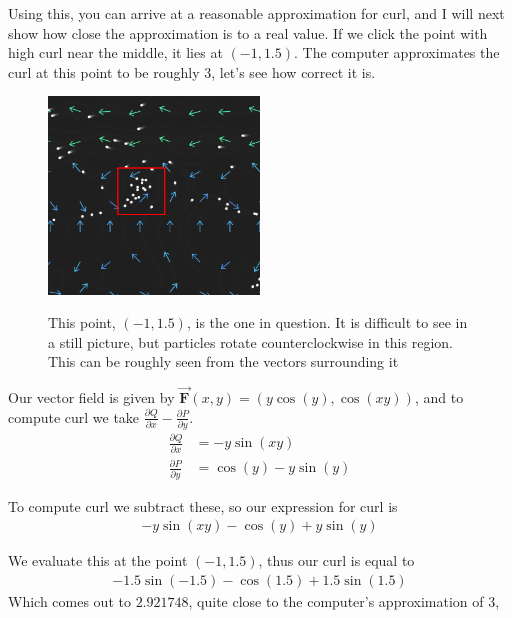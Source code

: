 \documentclass{article}
\begin{document}
    Using this, you can arrive at a reasonable approximation for curl, and I will next show how close the approximation is to a real value.
    If we click the point with high curl near the middle, it lies at $(-1, 1.5)$.
    The computer approximates the curl at this point to be roughly $3$, let's see how correct it is.
    \begin{figure}[h]
        \centering
        \includegraphics[width=0.5\textwidth]{2020-11-19_12-25}

        This point, $(-1, 1.5)$, is the one in question. It is difficult to see in a still picture, but particles rotate counterclockwise in this region.
        This can be roughly seen from the vectors surrounding it
    \end{figure}

    Our vector field is given by $\vec{ \mathbf{F} } (x, y) = (y \cos(y), \cos(xy))$, and to compute curl we take $\frac{\partial Q}{\partial x} - \frac{\partial P}{\partial y}$. 
    \begin{align*}
        \frac{\partial Q}{\partial x} &= -y\sin(xy) \\ 
        \frac{\partial P}{\partial y} &= \cos(y) - y\sin(y)
    \end{align*}

    To compute curl we subtract these, so our expression for curl is 
    \begin{gather*}
        -y\sin(xy) - \cos(y) + y\sin(y)
    \end{gather*}

    We evaluate this at the point $(-1, 1.5)$, thus our curl is equal to 
    \begin{gather*}
        -1.5\sin(-1.5) - \cos(1.5) + 1.5\sin(1.5) 
    \end{gather*}
    Which comes out to $2.921748$, quite close to the computer's approximation of $3$,
\end{document}

